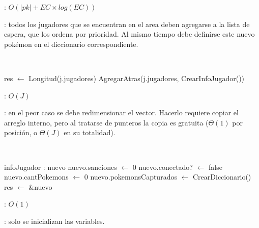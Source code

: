 \begin{Algoritmos}
	\complejidad: $O(|pk| + EC \times log(EC))$

	\justifcomp: todos los jugadores que se encuentran en el area deben agregarse a la lista de espera, que los ordena por prioridad. Al mismo tiempo debe definirse este nuevo pokémon en el diccionario correspondiente.



	~

	\begin{algorithm}[H]
		\NoCaptionOfAlgo
		\caption{}
		res $\leftarrow$ Longitud(j.jugadores)
		AgregarAtras(j.jugadores, CrearInfoJugador())
	\end{algorithm}

	\complejidad: $O(J)$

	\justifcomp: en el peor caso se debe redimensionar el vector. Hacerlo requiere copiar el arreglo interno, pero al tratarse de punteros la copia es gratuita ($\Theta(1)$ por posición, o $\Theta(J)$ en su totalidad).

	~

	\begin{algorithm}[H]
		\NoCaptionOfAlgo
		\caption{}
		infoJugador : nuevo
		nuevo.sanciones $\leftarrow$ 0
		nuevo.conectado? $\leftarrow$ false
		nuevo.cantPokemons $\leftarrow$ 0
		nuevo.pokemonsCapturados $\leftarrow$ CrearDiccionario()
		res $\leftarrow$ \&nuevo
	\end{algorithm}

	\complejidad: $O(1)$

	\justifcomp: solo se inicializan las variables.

	~


\end{Algoritmos}

